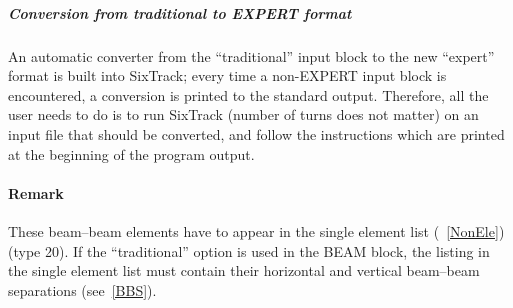 \subparagraph{Conversion from traditional to EXPERT format}
An automatic converter from the ``traditional'' input block to the new ``expert'' format is built into SixTrack; every time a non-EXPERT input block is encountered, a conversion is printed to the standard output.
Therefore, all the user needs to do is to run SixTrack (number of turns does not matter) on an input file that should be converted, and follow the instructions which are printed at the beginning of the program output.

\paragraph{Remark} These beam--beam elements have to appear in the single element list (~\ref{NonEle}) (type 20).
If the ``traditional'' option is used in the BEAM block, the listing in the single element list must contain their horizontal and vertical beam--beam separations (see~\ref{BBS}).

